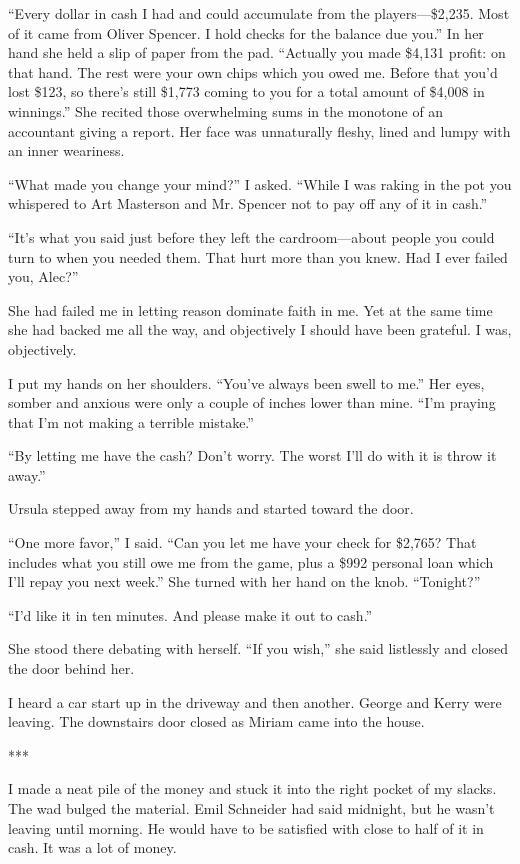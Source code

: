 \documentclass{novel}
\begin{document}
“Every dollar in cash I had and could accumulate from the players—\$2,235. Most of it came from Oliver Spencer. I hold checks for the balance due you.” In her hand she held a slip of paper from the pad. “Actually you made \$4,131 profit: on that hand. The rest were your own chips which you owed me. Before that you’d lost \$123, so there’s still \$1,773 coming to you for a total amount of \$4,008 in winnings.” She recited those overwhelming sums in the monotone of an accountant giving a report. Her face was unnaturally fleshy, lined and lumpy with an inner weariness.

“What made you change your mind?” I asked. “While I was raking in the pot you whispered to Art Masterson and Mr. Spencer not to pay off any of it in cash.”

“It’s what you said just before they left the cardroom—about people you could turn to when you needed them. That hurt more than you knew. Had I ever failed you, Alec?”

She had failed me in letting reason dominate faith in me. Yet at the same time she had backed me all the way, and objectively I should have been grateful. I was, objectively.

I put my hands on her shoulders. “You’ve always been swell to me.” Her eyes, somber and anxious were only a couple of inches lower than mine. “I’m praying that I’m not making a terrible mistake.”

“By letting me have the cash? Don’t worry. The worst I’ll do with it is throw it away.”

Ursula stepped away from my hands and started toward the door.

“One more favor,” I said. “Can you let me have your check for \$2,765? That includes what you still owe me from the game, plus a \$992 personal loan which I’ll repay you next week.” She turned with her hand on the knob. “Tonight?”

“I’d like it in ten minutes. And please make it out to cash.”

She stood there debating with herself. “If you wish,” she said listlessly and closed the door behind her.

I heard a car start up in the driveway and then another. George and Kerry were leaving. The downstairs door closed as Miriam came into the house.

***

I made a neat pile of the money and stuck it into the right pocket of my slacks. The wad bulged the material. Emil Schneider had said midnight, but he wasn’t leaving until morning. He would have to be satisfied with close to half of it in cash. It was a lot of money.
\end{document}
